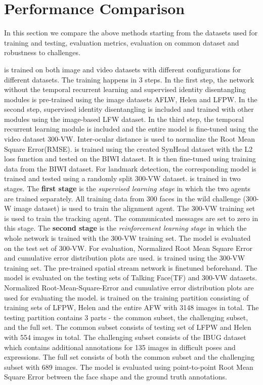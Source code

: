 \documentclass{llncs}
\begin{document}
\section{Performance Comparison}
In this section we compare the above methods starting from the datasets used for training and testing, evaluation metrics, evaluation on common dataset and robustness to challenges.

\cite{rednet} is trained on both image and video datasets with different configurations for different datasets. The training happens in 3 steps. In the first step, the network without the temporal recurrent learning and supervised identity disentangling modules is pre-trained using the image datasets AFLW, Helen and LFPW. In the second step, supervised identity disentangling is included and trained with other modules using the image-based LFW dataset. In the third step, the temporal recurrent learning module is included and the entire model is fine-tuned using the video dataset 300-VW. Inter-ocular distance is used to normalize the Root Mean Square Error(RMSE). \cite{dynamic_facial_analysis} is trained using the created SynHead dataset with the L2 loss function and tested on the BIWI dataset. It is then fine-tuned using training data from the BIWI dataset. For landmark detection, the corresponding model is trained and tested using a randomly split 300-VW dataset. \cite{dadrl} is trained in two stages. The \textbf{first stage} is the \textit{supervised learning stage} in which the two agents are trained separately. All training data from 300 faces in the wild challenge (300-W image dataset) is used to train the alignment agent. The 300-VW training set is used to train the tracking agent. The communicated messages are set to zero in this stage. The \textbf{second stage} is the \textit{reinforcement learning stage} in which the whole network is trained with the 300-VW training set. The model is evaluated on the test set of 300-VW. For evaluation, Normalized Root Mean Square Error and cumulative error distribution plots are used. \cite{tstn} is trained using the 300-VW training set. The pre-trained spatial stream network is finetuned beforehand. The model is evaluated on the testing sets of Talking Face(TF) and 300-VW datasets. Normalized Root-Mean-Square-Error and cumulative error distribution plots are used for evaluating the model. \cite{farn} is trained on the training partition consisting of training sets of LFPW, Helen and the entire AFW with 3148 images in total. The testing partition contains 3 parts - the common subset, the challenging subset, and the full set. The common subset consists of testing set of LFPW and Helen with 554 images in total. The challenging subset consists of the IBUG dataset which contains additional annotations for 135 images in difficult poses and expressions. The full set consists of both the common subset and the challenging subset with 689 images. The model is evaluated using point-to-point Root Mean Square Error between the face shape and the ground truth annotations.\\
\end{document}
